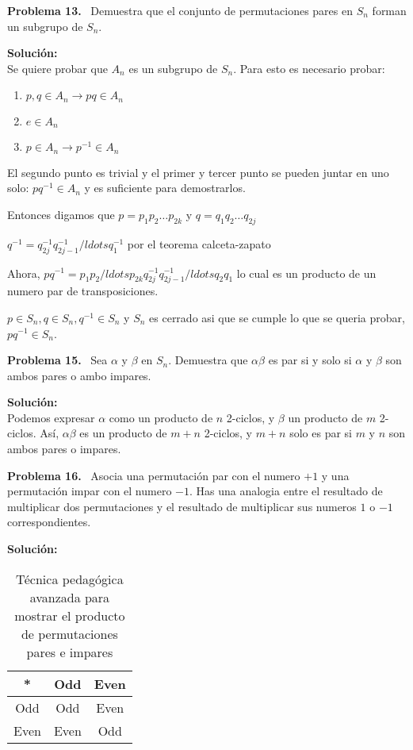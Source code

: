\documentclass{article}
\newcounter{problem}
\newcounter{solution}
\newcommand\Problem[1]{%
  \stepcounter{problem}%
  \textbf{Problema #1.}~%
  \setcounter{solution}{0}%
}
\newcommand\TheSolution{%
  \textbf{Solución:}\\%
}
\begin{document}
\Problem{13} Demuestra que el conjunto de permutaciones pares en $S_n$ forman
un subgrupo de $S_n$.

\TheSolution{}
Se quiere probar que $A_{n}$ es un subgrupo de $S_{n}$.
Para esto es necesario probar:

\begin{enumerate}
    \item $p, q \in A_{n} \rightarrow pq \in A_{n}$
    
    \item $e \in A_{n}$
    
    \item $p \in A_{n} \rightarrow p^{-1} \in A_{n}$
\end{enumerate}

El segundo punto es trivial y el primer y tercer punto se pueden juntar en uno
solo: $p q^{-1} \in A_{n}$ y es suficiente para demostrarlos.

Entonces digamos que $p = p_{1} p_{2} \ldots  p_{2k}$ y
$q = q_{1} q_{2} \ldots  q_{2j}$

$q^{-1} = q^{-1}_{2j} q^{-1}_{2j-1} /ldots q^{-1}_{1}$ por el teorema
calceta-zapato

Ahora, $p q^{-1} = p_{1} p_{2} /ldots p_{2k} q^{-1}_{2j} q^{-1}_{2j-1} /ldots q_{2}
q_{1}$ lo cual es un producto de un numero par de transposiciones.

$p \in S_{n}, q \in S_{n}, q^{-1} \in S_{n}$ y $S_{n}$ es cerrado asi que se
cumple lo que se queria probar, $p q^{-1} \in S_{n}$.

\Problem{15} Sea $\alpha$ y $\beta$ en $S_n$. Demuestra que $\alpha\beta$ es
par si y solo si $\alpha$ y $\beta$ son ambos pares o ambo impares.

\TheSolution{} Podemos expresar $\alpha$ como un producto de $n$ 2-ciclos, y
$\beta$ un producto de $m$ 2-ciclos. Así, $\alpha\beta$ es un producto de
$m + n$ 2-ciclos, y $m + n$ solo es par si $m$ y $n$ son ambos pares o
impares.

\Problem{16} Asocia una permutación par con el numero $+1$ y una permutación
impar con el numero $-1$. Has una analogia entre el resultado de multiplicar
dos permutaciones y el resultado de multiplicar sus numeros $1$ o $-1$
correspondientes.

\TheSolution{}
\begin{table}[htbp]
\begin{center}
\begin{tabular}{c|cc}
* & Odd & Even \\ \hline
Odd & Odd  & Even\\
Even & Even & Odd \\
\end{tabular}
\caption{Técnica pedagógica avanzada para mostrar el producto de permutaciones
pares e impares}
\end{center}
\end{table}
\end{document}
